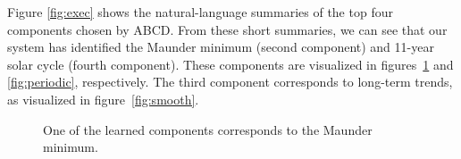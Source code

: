 \documentclass[letterpaper]{article}
\newcommand{\procedurename}{ABCD}
\begin{document}
Figure \ref{fig:exec} shows the natural-language summaries of the top four components chosen by \procedurename{}.
%
%
From these short summaries, we can see that our system has identified the Maunder minimum (second component) and 11-year solar cycle (fourth component).
These components are visualized in figures~\ref{fig:maunder} and \ref{fig:periodic}, respectively. 
The third component corresponds to long-term trends, as visualized in figure~\ref{fig:smooth}.

\begin{figure}[ht]
\centering
{}
\caption{One of the learned components corresponds to the Maunder minimum.}
\label{fig:maunder}
\end{figure}
\end{document}
